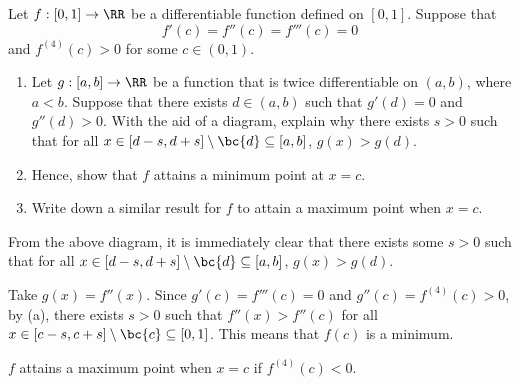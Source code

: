 \begin{problem}
    Let $f : [0, 1] \to \RR$ be a differentiable function defined on $[0, 1]$. Suppose that \[f'(c) = f''(c) = f'''(c) = 0\] and $f^{(4)}(c) > 0$ for some $c \in (0, 1)$.

    \begin{enumerate}
        \item Let $g: [a, b] \to \RR$ be a function that is twice differentiable on $(a, b)$, where $a < b$. Suppose that there exists $d \in (a, b)$ such that $g'(d) = 0$ and $g''(d) > 0$. With the aid of a diagram, explain why there exists $s > 0$ such that for all $x \in [d -s , d + s] \setminus \bc{d} \subseteq [a, b]$, $g(x) > g(d)$.
        \item Hence, show that $f$ attains a minimum point at $x = c$.
        \item Write down a similar result for $f$ to attain a maximum point when $x = c$.
    \end{enumerate}
\end{problem}
\begin{solution}
    \begin{ppart}
        \begin{figure}[H]
        \centering
        \end{figure}
        From the above diagram, it is immediately clear that there exists some $s > 0$ such that for all $x \in [d -s , d + s] \setminus \bc{d} \subseteq [a, b]$, $g(x) > g(d)$.
    \end{ppart}
    \begin{ppart}
        Take $g(x) = f''(x)$. Since $g'(c) = f'''(c) = 0$ and $g''(c) = f^{(4)}(c) > 0$, by (a), there exists $s > 0$ such that $f''(x) > f''(c)$ for all $x \in [c-s, c+s] \setminus \bc{c} \subseteq [0, 1]$. This means that $f(c)$ is a minimum. 
    \end{ppart}
    \begin{ppart}
        $f$ attains a maximum point when $x = c$ if $f^{(4)}(c) < 0$.
    \end{ppart}
\end{solution}

